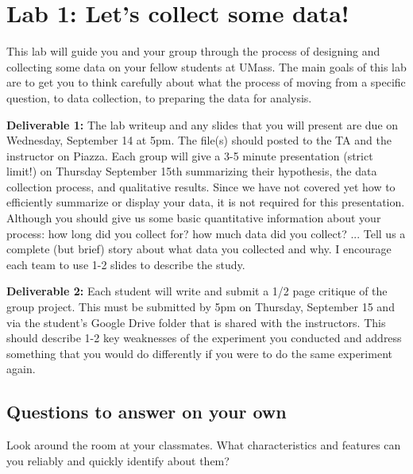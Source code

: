 \documentclass{article}\usepackage[]{graphicx}\usepackage[]{color}
\begin{document}

\section*{Lab 1: Let's collect some data!}

This lab will guide you and your group through the process of designing and collecting some data on your fellow students at UMass. The main goals of this lab are to get you to think carefully about what the process of moving from a specific question, to data collection, to preparing the data for analysis.

{\bf Deliverable 1:}
The lab writeup and any slides that you will present are due on Wednesday, September 14 at 5pm. The file(s) should posted to the TA and the instructor on Piazza. Each group will give a 3-5 minute presentation (strict limit!) on Thursday September 15th summarizing their hypothesis, the data collection process, and qualitative results. Since we have not covered yet how to efficiently summarize or display your data, it is not required for this presentation. Although you should give us some basic quantitative information about your process: how long did you collect for? how much data did you collect? ... Tell us a complete (but brief) story about what data you collected and why. I encourage each team to use 1-2 slides to describe the study.

{\bf Deliverable 2:} 
Each student will write and submit a 1/2 page critique of the group project. This must be submitted by 5pm on Thursday, September 15 and via the student's Google Drive folder that is shared with the instructors. This should describe 1-2 key weaknesses of the experiment you conducted and address something that you would do differently if you were to do the same experiment again.

\subsection*{Questions to answer on your own}

\begin{exercise}
Look around the room at your classmates. What characteristics and features can you reliably and quickly identify about them? 
\end{exercise}
\end{document}
